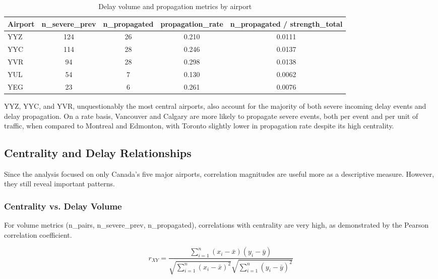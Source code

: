 \documentclass[10pt]{article}
\begin{document}
\begin{table}[h!]
    \centering
    \caption{Delay volume and propagation metrics by airport}
    \begin{tabular}{lcccc}
        \toprule
        Airport & n\_severe\_prev & n\_propagated & propagation\_rate & n\_propagated / strength\_total \\
        \midrule
        YYZ & 124 & 26 & 0.210 & 0.0111 \\
        YYC & 114 & 28 & 0.246 & 0.0137 \\
        YVR & 94  & 28 & 0.298 & 0.0138 \\
        YUL & 54  & 7  & 0.130 & 0.0062 \\
        YEG & 23  & 6  & 0.261 & 0.0076 \\
        \bottomrule
    \end{tabular}
\end{table}

YYZ, YYC, and YVR, unquestionably the most central airports, also account for the majority of both severe incoming delay events and delay propagation. On a rate basis, Vancouver and Calgary are more likely to propagate severe events, both per event and per unit of traffic, when compared to Montreal and Edmonton, with Toronto slightly lower in propagation rate despite its high centrality.

\subsection{Centrality and Delay Relationships}

Since the analysis focused on only Canada's five major airports, correlation magnitudes are useful more as a descriptive measure. However, they still reveal important patterns.

\subsubsection{Centrality vs. Delay Volume}

For volume metrics (n\_pairs, n\_severe\_prev, n\_propagated), correlations with centrality are very high, as demonstrated by the Pearson correlation coefficient.

\[
r_{XY}
=
\frac{\displaystyle\sum_{i=1}^{n} (x_i - \bar{x})(y_i - \bar{y})}
     {\sqrt{\displaystyle\sum_{i=1}^{n} (x_i - \bar{x})^2}
      \sqrt{\displaystyle\sum_{i=1}^{n} (y_i - \bar{y})^2}}
\]
\end{document}
